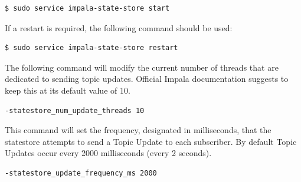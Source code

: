 \documentclass[onecolumn, draftclsnofoot,10pt, compsoc]{IEEEtran}
\begin{document}
    \begin{center}
    \begin{lstlisting}[language=bash]
$ sudo service impala-state-store start
    \end{lstlisting}
    \end{center}

If a restart is required, the following command should be used:
    \begin{center}
    \begin{lstlisting}[language=bash]
$ sudo service impala-state-store restart
    \end{lstlisting}
    \end{center}

The following command will modify the current number of threads that are dedicated to sending topic updates. Official Impala documentation suggests to keep this at its default value of 10.
    \begin{center}
    \begin{lstlisting}[language=bash]
-statestore_num_update_threads 10
    \end{lstlisting}
    \end{center}

This command will set the frequency, designated in milliseconds, that the statestore attempts to send a Topic Update to each subscriber. By default Topic Updates occur every 2000 milliseconds (every 2 seconds).
    \begin{center}
    \begin{lstlisting}[language=bash]
-statestore_update_frequency_ms 2000
    \end{lstlisting}
    \end{center}
\end{document}
